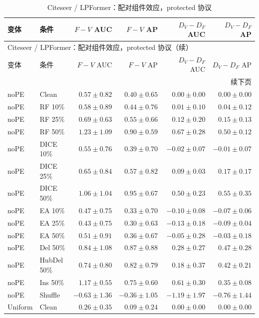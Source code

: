 {\footnotesize
\setlength{\tabcolsep}{3.2pt}
\renewcommand{\arraystretch}{1.10}
\begin{longtable}{llrrrr}
\caption{Citeseer / LPFormer：配对组件效应，protected 协议}\\
\toprule
变体 & 条件 & $F-V$ AUC & $F-V$ AP & $D_V-D_F$ AUC & $D_V-D_F$ AP \\
\midrule
\endfirsthead
\multicolumn{6}{l}{Citeseer / LPFormer：配对组件效应，protected 协议（续）}\\
\toprule
变体 & 条件 & $F-V$ AUC & $F-V$ AP & $D_V-D_F$ AUC & $D_V-D_F$ AP \\
\midrule
\endhead
\midrule\multicolumn{6}{r}{续下页}\\
\endfoot
\bottomrule
\endlastfoot
noPE & Clean & $0.57\pm0.82$ & $0.40\pm0.65$ & $0.00\pm0.00$ & $0.00\pm0.00$ \\
noPE & RF 10\% & $0.58\pm0.89$ & $0.44\pm0.76$ & $0.01\pm0.10$ & $0.04\pm0.12$ \\
noPE & RF 25\% & $0.69\pm0.63$ & $0.55\pm0.66$ & $0.12\pm0.20$ & $0.15\pm0.13$ \\
noPE & RF 50\% & $1.23\pm1.09$ & $0.90\pm0.59$ & $0.67\pm0.28$ & $0.50\pm0.12$ \\
noPE & DICE 10\% & $0.55\pm0.76$ & $0.39\pm0.70$ & $-0.02\pm0.07$ & $-0.01\pm0.07$ \\
noPE & DICE 25\% & $0.65\pm0.84$ & $0.57\pm0.82$ & $0.09\pm0.03$ & $0.17\pm0.17$ \\
noPE & DICE 50\% & $1.06\pm1.04$ & $0.95\pm0.67$ & $0.50\pm0.23$ & $0.55\pm0.35$ \\
noPE & EA 10\% & $0.47\pm0.75$ & $0.33\pm0.70$ & $-0.10\pm0.08$ & $-0.07\pm0.06$ \\
noPE & EA 25\% & $0.43\pm0.75$ & $0.30\pm0.63$ & $-0.13\pm0.18$ & $-0.09\pm0.04$ \\
noPE & EA 50\% & $0.51\pm0.91$ & $0.36\pm0.67$ & $-0.05\pm0.28$ & $-0.03\pm0.18$ \\
noPE & Del 50\% & $0.84\pm1.08$ & $0.87\pm0.88$ & $0.28\pm0.27$ & $0.47\pm0.28$ \\
noPE & HubDel 50\% & $0.74\pm0.80$ & $0.82\pm0.79$ & $0.18\pm0.37$ & $0.42\pm0.21$ \\
noPE & Ins 50\% & $1.17\pm0.55$ & $0.75\pm0.60$ & $0.61\pm0.30$ & $0.35\pm0.08$ \\
noPE & Shuffle & $-0.63\pm1.36$ & $-0.36\pm1.05$ & $-1.19\pm1.97$ & $-0.76\pm1.44$ \\
Uniform & Clean & $0.26\pm0.35$ & $0.09\pm0.24$ & $0.00\pm0.00$ & $0.00\pm0.00$ \\

\end{longtable}}
